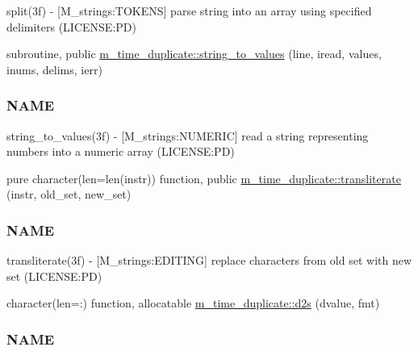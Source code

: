 \begin{DoxyCompactItemize}
\begin{DoxyCompactList}
split(3f) -\/ \mbox{[}M\+\_\+strings\+:T\+O\+K\+E\+NS\mbox{]} parse string into an array using specified delimiters (L\+I\+C\+E\+N\+SE\+:PD) \end{DoxyCompactList}\item 
subroutine, public \mbox{\hyperlink{namespacem__time__duplicate_a1bfa9e4483f2452c89c0388971bb21bd}{m\+\_\+time\+\_\+duplicate\+::string\+\_\+to\+\_\+values}} (line, iread, values, inums, delims, ierr)
\begin{DoxyCompactList}\small\item\em \subsubsection*{N\+A\+ME}

string\+\_\+to\+\_\+values(3f) -\/ \mbox{[}M\+\_\+strings\+:N\+U\+M\+E\+R\+IC\mbox{]} read a string representing numbers into a numeric array (L\+I\+C\+E\+N\+SE\+:PD) \end{DoxyCompactList}\item 
pure character(len=len(instr)) function, public \mbox{\hyperlink{namespacem__time__duplicate_ac8388a45881cf7c2f9047b4d643ed3f2}{m\+\_\+time\+\_\+duplicate\+::transliterate}} (instr, old\+\_\+set, new\+\_\+set)
\begin{DoxyCompactList}\small\item\em \subsubsection*{N\+A\+ME}

transliterate(3f) -\/ \mbox{[}M\+\_\+strings\+:E\+D\+I\+T\+I\+NG\mbox{]} replace characters from old set with new set (L\+I\+C\+E\+N\+SE\+:PD) \end{DoxyCompactList}\item 
character(len=\+:) function, allocatable \mbox{\hyperlink{namespacem__time__duplicate_a84f53c1e0d6c1c9fe70b19549921d14b}{m\+\_\+time\+\_\+duplicate\+::d2s}} (dvalue, fmt)
\begin{DoxyCompactList}\small\item\em \subsubsection*{N\+A\+ME}


\end{DoxyCompactList}
\end{DoxyCompactItemize}

